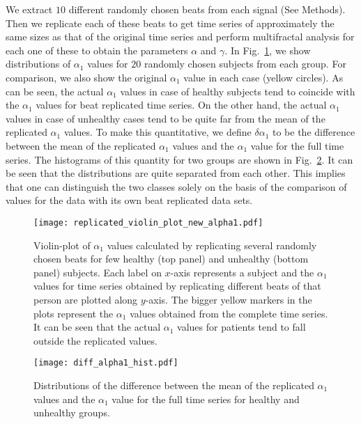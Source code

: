 \documentclass[9pt,twocolumn,twoside]{pnas-new}
\begin{document}
We extract $10$ different randomly chosen beats from each signal (See Methods). Then we replicate each of these beats to get time series of approximately the same sizes as that of the original time series and perform multifractal analysis for each one of these to obtain the parameters $\alpha$ and $\gamma$. In Fig.~\ref{replicate_violin}, we show distributions of $\alpha_1$ values for $20$ randomly chosen subjects from each group. For comparison, we also show the original $\alpha_1$ value in each case (yellow circles). As can be seen, the actual $\alpha_1$ values in case of healthy subjects tend to coincide with the $\alpha_1$ values for beat replicated time series. On the other hand, the actual $\alpha_1$ values in case of unhealthy cases tend to be quite far from the mean of the replicated $\alpha_1$ values. To make this quantitative, we define $\delta\alpha_1$ to be the difference between the mean of the replicated $\alpha_1$ values and the $\alpha_1$ value for the full time series. The histograms of this quantity for two groups are shown in Fig.~\ref{diff_alpha1}. It can be seen that the distributions are quite separated from each other. This implies that one can distinguish the two classes solely on the basis of the comparison of values for the data with its own beat replicated data sets. 

\begin{figure}[h]
\begin{center}
\texttt{[image: replicated\_violin\_plot\_new\_alpha1.pdf]}
\caption{\label{replicate_violin} Violin-plot of $\alpha_1$ values calculated by replicating several randomly chosen beats for few healthy (top panel) and unhealthy (bottom panel) subjects. Each label on $x$-axis represents a subject and the $\alpha_1$ values for time series obtained by replicating different beats of that person are plotted along $y$-axis. The bigger yellow markers in the plots represent the $\alpha_1$ values obtained from the complete time series. It can be seen that the actual $\alpha_1$ values for patients tend to fall outside the replicated values.}
\end{center}
\end{figure}

\begin{figure}[h]
\begin{center}
\texttt{[image: diff\_alpha1\_hist.pdf]}
\caption{\label{diff_alpha1}  Distributions of the difference between the mean of the replicated $\alpha_1$ values and the $\alpha_1$ value for the full time series for healthy and unhealthy groups.}
\end{center}
\end{figure}
\end{document}
